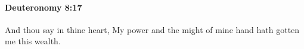 
		\paragraph{Deuteronomy 8:17} %
			\label{DEUTERONOMY-8-17}

			And thou say in thine heart, My power and the might of mine hand hath gotten me this wealth.


